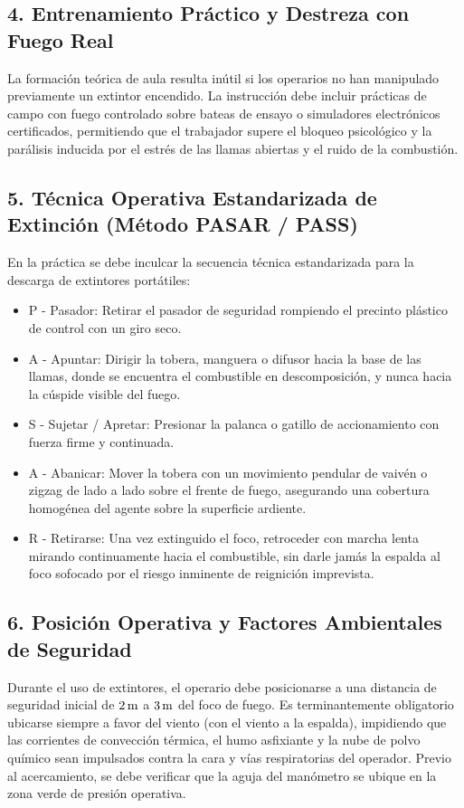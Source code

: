 \subsection{4. Entrenamiento Práctico y Destreza con Fuego Real}
La formación teórica de aula resulta inútil si los operarios no han manipulado previamente un extintor encendido. La
instrucción debe incluir prácticas de campo con fuego controlado sobre bateas de ensayo o simuladores electrónicos
certificados, permitiendo que el trabajador supere el bloqueo psicológico y la parálisis inducida por el estrés de las
llamas abiertas y el ruido de la combustión.

\subsection{5. Técnica Operativa Estandarizada de Extinción (Método PASAR / PASS)}
En la práctica se debe inculcar la secuencia técnica estandarizada para la descarga de extintores portátiles:
\begin{itemize}
    \item P - Pasador: Retirar el pasador de seguridad rompiendo el precinto plástico de control con un giro seco.
    \item A - Apuntar: Dirigir la tobera, manguera o difusor hacia la base de las llamas, donde se encuentra el
          combustible en descomposición, y nunca hacia la cúspide visible del fuego.
    \item S - Sujetar / Apretar: Presionar la palanca o gatillo de accionamiento con fuerza firme y continuada.
    \item A - Abanicar: Mover la tobera con un movimiento pendular de vaivén o zigzag de lado a lado sobre el frente de
          fuego, asegurando una cobertura homogénea del agente sobre la superficie ardiente.
    \item R - Retirarse: Una vez extinguido el foco, retroceder con marcha lenta mirando continuamente hacia el combustible,
          sin darle jamás la espalda al foco sofocado por el riesgo inminente de reignición imprevista.
\end{itemize}

\subsection{6. Posición Operativa y Factores Ambientales de Seguridad}
Durante el uso de extintores, el operario debe posicionarse a una distancia de seguridad inicial de $2\,\mathrm{m}$ a $3\,\mathrm{m}$ del
foco de fuego. Es terminantemente obligatorio ubicarse siempre a favor del viento (con el viento a la espalda),
impidiendo que las corrientes de convección térmica, el humo asfixiante y la nube de polvo químico sean impulsados contra
la cara y vías respiratorias del operador. Previo al acercamiento, se debe verificar que la aguja del manómetro se ubique
en la zona verde de presión operativa.

